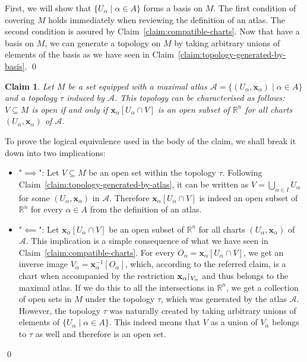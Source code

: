 \documentclass[11pt,a4paper,twoside,openany]{report}
\theoremstyle{my-theorem}
\newtheorem{claim}[theorem]{Claim}
\theoremstyle{non-theorem}
\renewenvironment{proof}[1][\proofname]{{\scshape #1. }}{\qed}
\begin{document}
		\begin{proof}
			First, we will show that $\{U_\alpha \mid \alpha \in A\}$ forms a basis on $M$. The first condition of covering $M$ holds immediately when reviewing the definition of an atlas. The second condition is assured by Claim~\ref{claim:compatible-charts}. Now that have a basis on $M$, we can generate a topology on $M$ by taking arbitrary unions of elements of the basis as we have seen in Claim~\ref{claim:topology-generated-by-basis}.
		\end{proof}
	
		\begin{claim}
			Let $M$ be a set equipped with a maximal atlas $\mathcal A = \{(U_\alpha, \mathbf x_\alpha) \mid \alpha \in A\}$ and a topology $\tau$ induced by $\mathcal A$. This topology can be characterised as follows: $V \subseteq M$ is open if and only if $\mathbf x_\alpha[U_\alpha \cap V]$ is an open subset of $\mathbb R^n$ for all charts $(U_\alpha, \mathbf x_\alpha)$ of $\mathcal A$.
		\end{claim}
	
		\begin{proof}
			To prove the logical equivalence used in the body of the claim, we shall break it down into two implications:
			\begin{itemize}
				\item "$\implies$": Let $V \subseteq M$ be an open set within the topology $\tau$. Following Claim~\ref{claim:topology-generated-by-atlas}, it can be written as $V = \bigcup_{\alpha \in I} U_\alpha$ for some $(U_\alpha,\mathbf x_\alpha)$ in $\mathcal A$. Therefore $\mathbf x_\alpha [U_\alpha \cap V]$ is indeed an open subset of $\mathbb R^n$ for every $\alpha \in A$ from the definition of an atlas.
				
				\item "$\impliedby$": Let $\mathbf x_\alpha[U_\alpha \cap V]$ be an open subset of $\mathbb R^n$ for all charts $(U_\alpha, \mathbf x_\alpha)$ of $\mathcal A$. This implication is a simple consequence of what we have seen in Claim~\ref{claim:compatible-charts}. For every $O_\alpha = \mathbf x_\alpha[U_\alpha \cap V]$, we get an inverse image $V_\alpha = \mathbf x_\alpha^{-1}[O_\alpha]$, which, according to the referred claim, is a chart when accompanied by the restriction $\mathbf x_\alpha \!\!\upharpoonright_{V_\alpha}$ and thus belongs to the maximal atlas. If we do this to all the intersections in $\mathbb R^n$, we get a collection of open sets in $M$ under the topology $\tau$, which was generated by the atlas $\mathcal A$. However, the topology $\tau$ was naturally created by taking arbitrary unions of elements of $\{ U_\alpha \mid \alpha \in A \}$. This indeed means that $V$ as a union of $V_\alpha$ belongs to $\tau$ as well and therefore is an open set.
			\end{itemize}
		\end{proof}
	
\end{document}
